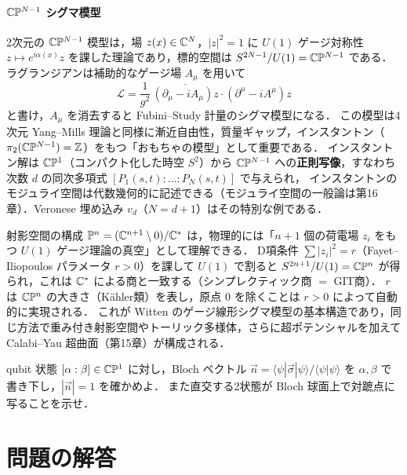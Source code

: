 \paragraph{$\mathbb{C}\mathbb{P}^{N-1}$ シグマ模型}
2次元の $\mathbb{C}\mathbb{P}^{N-1}$ 模型は，場 $z(x)\in\mathbb{C}^N$，$|z|^2=1$ に $U(1)$ ゲージ対称性 $z\mapsto e^{i\alpha(x)}z$ を課した理論であり，標的空間は $S^{2N-1}/U(1)=\mathbb{C}\mathbb{P}^{N-1}$ である．
ラグランジアンは補助的なゲージ場 $A_\mu$ を用いて
\[
  \mathcal L=\frac1{g^2}\,\overline{(\partial_\mu-iA_\mu)z}\cdot(\partial^\mu-iA^\mu)z
\]
と書け，$A_\mu$ を消去すると Fubini–Study 計量のシグマ模型になる．
この模型は4次元 Yang–Mills 理論と同様に漸近自由性，質量ギャップ，インスタントン（$\pi_2(\mathbb{C}\mathbb{P}^{N-1})=\mathbb{Z}$）をもつ「おもちゃの模型」として重要である．
インスタントン解は $\mathbb{C}\mathbb{P}^1$（コンパクト化した時空 $S^2$）から $\mathbb{C}\mathbb{P}^{N-1}$ への\textbf{正則写像}，すなわち次数 $d$ の同次多項式 $[P_1(s,t):\dots:P_N(s,t)]$ で与えられ，
インスタントンのモジュライ空間は代数幾何的に記述できる（モジュライ空間の一般論は第16章）．Veronese 埋め込み $v_d$（$N=d+1$）はその特別な例である．

\begin{physbox}[ゲージ理論としての射影空間]
射影空間の構成 $\mathbb{P}^n=(\mathbb{C}^{n+1}\setminus0)/\mathbb{C}^*$ は，物理的には「$n+1$ 個の荷電場 $z_i$ をもつ $U(1)$ ゲージ理論の真空」として理解できる．
D項条件 $\sum|z_i|^2=r$（Fayet–Iliopoulos パラメータ $r>0$）を課して $U(1)$ で割ると $S^{2n+1}/U(1)=\mathbb{C}\mathbb{P}^n$ が得られ，これは $\mathbb{C}^*$ による商と一致する（シンプレクティック商 $=$ GIT商）．
$r$ は $\mathbb{C}\mathbb{P}^n$ の大きさ（Kähler類）を表し，原点 $0$ を除くことは $r>0$ によって自動的に実現される．
これが Witten のゲージ線形シグマ模型の基本構造であり，同じ方法で重み付き射影空間やトーリック多様体，さらに超ポテンシャルを加えて Calabi–Yau 超曲面（第15章）が構成される．
\end{physbox}

qubit 状態 $[\alpha:\beta]\in\mathbb{C}\mathbb{P}^1$ に対し，Bloch ベクトル $\vec n=\langle\psi|\vec\sigma|\psi\rangle/\langle\psi|\psi\rangle$ を $\alpha,\beta$ で書き下し，$|\vec n|=1$ を確かめよ．
また直交する2状態が Bloch 球面上で対蹠点に写ることを示せ．

\section*{問題の解答}

